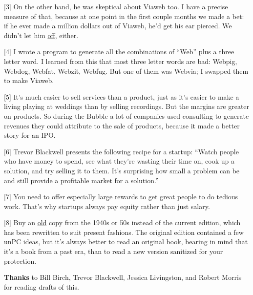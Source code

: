 {[}3{]} On the other hand, he was skeptical about Viaweb too. I have a
precise measure of that, because at one point in the first couple months
we made a bet: if he ever made a million dollars out of Viaweb, he'd get
his ear pierced. We didn't let him \href{pierced.html}{off}, either.

{[}4{]} I wrote a program to generate all the combinations of ``Web''
plus a three letter word. I learned from this that most three letter
words are bad: Webpig, Webdog, Webfat, Webzit, Webfug. But one of them
was Webvia; I swapped them to make Viaweb.

{[}5{]} It's much easier to sell services than a product, just as it's
easier to make a living playing at weddings than by selling recordings.
But the margins are greater on products. So during the Bubble a lot of
companies used consulting to generate revenues they could attribute to
the sale of products, because it made a better story for an IPO.

{[}6{]} Trevor Blackwell presents the following recipe for a startup:
``Watch people who have money to spend, see what they're wasting their
time on, cook up a solution, and try selling it to them. It's surprising
how small a problem can be and still provide a profitable market for a
solution.''

{[}7{]} You need to offer especially large rewards to get great people
to do tedious work. That's why startups always pay equity rather than
just salary.

{[}8{]} Buy an
\href{http://dogbert.abebooks.com/servlet/SearchResults?bx=on&sts=t&ds=30&bi=0&an=carnegie&kn=1938+OR+1939+OR+1940+OR+1941+OR+1942+OR+1943+OR+1944+OR+1945+OR+1946+OR+1947+OR+1948&tn=influence+friends&sortby=2}{old}
copy from the 1940s or 50s instead of the current edition, which has
been rewritten to suit present fashions. The original edition contained
a few unPC ideas, but it's always better to read an original book,
bearing in mind that it's a book from a past era, than to read a new
version sanitized for your protection.

\textbf{Thanks} to Bill Birch, Trevor Blackwell, Jessica Livingston, and
Robert Morris for reading drafts of this.
